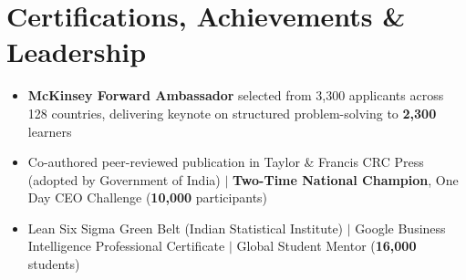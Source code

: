 \documentclass[letterpaper,10pt]{article}
\newcommand{\resumeItem}[1]{
  \item{#1 \vspace{-1pt}}
}
\newcommand{\resumeItemListStart}{\begin{itemize}[leftmargin=0.15in, label=$\bullet$]}
\newcommand{\resumeItemListEnd}{\end{itemize}\vspace{-2pt}}
\begin{document}
\section{Certifications, Achievements \& Leadership}
\resumeItemListStart
\resumeItem{\textbf{McKinsey Forward Ambassador} selected from 3,300 applicants across 128 countries, delivering keynote on structured problem-solving to \textbf{2,300} learners}
\resumeItem{Co-authored peer-reviewed publication in Taylor \& Francis CRC Press (adopted by Government of India) $|$ \textbf{Two-Time National Champion}, One Day CEO Challenge (\textbf{10,000} participants)}
\resumeItem{Lean Six Sigma Green Belt (Indian Statistical Institute) $|$ Google Business Intelligence Professional Certificate $|$ Global Student Mentor (\textbf{16,000} students)}
\resumeItemListEnd
\end{document}
